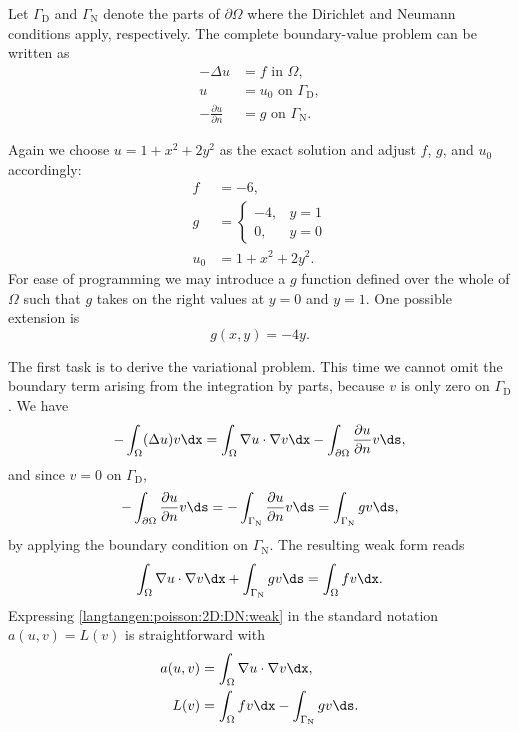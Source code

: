 Let $\Gamma_{\mathrm{D}}$ and $\Gamma_{\mathrm{N}}$ denote the parts of $\partial\Omega$ where
the Dirichlet and Neumann conditions apply, respectively.  The complete
boundary-value problem can be written as
\begin{align}
  -\Delta u &= f \mbox{ in } \Omega,
\\
  u &= u_0 \mbox{ on } \Gamma_{\mathrm{D}},
\\
  -\frac{\partial u}{\partial n} &= g \mbox{ on } \Gamma_{\mathrm{N}}.
\end{align}

\clearpage

\noindent
Again we choose $u=1+x^2 + 2y^2$ as the exact solution and adjust $f$,
$g$, and $u_0$ accordingly:
\begin{align}
f &= -6,
\\
g &= \left\lbrace\begin{array}{ll}
-4, & y=1\\
0,  & y=0
\end{array}\right.
\\
u_0 &= 1 + x^2 + 2y^2.
\end{align}
For ease of programming we may introduce a $g$ function defined over
the whole of $\Omega$ such that $g$ takes on the right values at $y=0$
and $y=1$. One possible extension is
\begin{equation}
   g(x,y) = -4y.
\end{equation}

The first task is to derive the variational problem. This time we cannot
omit the boundary term arising from the integration by parts, because $v$
is only zero on $\Gamma_{\mathrm{D}}$. We have
\begin{equation}
 -\int_\Omega (\Delta u)v \dx
= \int_\Omega\nabla u\cdot\nabla v\dx
  - \int_{\partial\Omega} \frac{\partial u}{\partial n}v\ds,
\end{equation}
and since $v=0$ on $\Gamma_{\mathrm{D}}$,
\begin{align}
- \int_{\partial\Omega} \frac{\partial u}{\partial n}v\ds
=
- \int_{\Gamma_{\mathrm{N}}} \frac{\partial u}{\partial n}v\ds
= \int_{\Gamma_{\mathrm{N}}}gv\ds,
\end{align}
by applying the boundary condition on $\Gamma_{\mathrm{N}}$.  The resulting weak
form reads
\begin{equation}
\int_{\Omega} \nabla u \cdot \nabla v \dx +
\int_{\Gamma_{\mathrm{N}}} gv\ds
= \int_{\Omega} fv \dx.
\label{langtangen:poisson:2D:DN:weak}
\end{equation}
Expressing \eqref{langtangen:poisson:2D:DN:weak} in the standard notation
$a(u,v)=L(v)$ is straightforward with
\begin{align}
  a(u, v) &= \int_{\Omega} \nabla u \cdot \nabla v \dx,
  \label{langtangen:poisson2:vard:a}
\\
  L(v) &= \int_{\Omega} fv \dx - \int_{\Gamma_{\mathrm{N}}} gv\ds.
  \label{langtangen:poisson2:vard:L}
\end{align}

